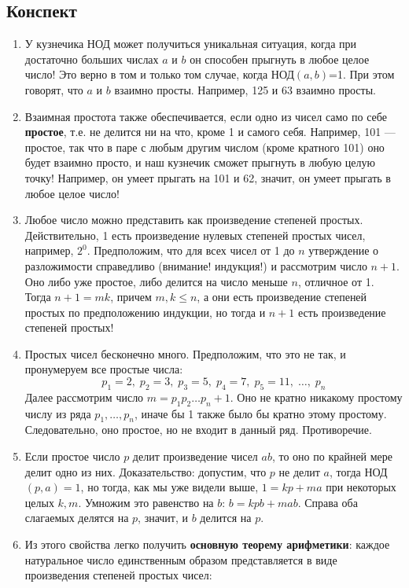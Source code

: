 \subsection{Конспект}
\begin{enumerate}\setlength{\itemsep}{1pt}
\item У кузнечика НОД может получиться уникальная ситуация, когда при достаточно больших числах $a$ и $b$ он способен прыгнуть в любое целое число! Это верно в том и только том случае, когда НОД$(a,b)$=1. При этом говорят, что $a$ и $b$ взаимно просты. Например, 125 и 63 взаимно просты.
\item Взаимная простота также обеспечивается, если одно из чисел само по себе \textbf{простое}, т.е. не делится ни на что, кроме 1 и самого себя. Например, 101 --- простое, так что в паре с любым другим числом (кроме кратного 101) оно будет взаимно просто, и наш кузнечик сможет прыгнуть в любую целую точку! Например, он умеет прыгать на 101 и 62, значит, он умеет прыгать в любое целое число!
\item Любое число можно представить как произведение степеней простых. Действительно, 1 есть произведение нулевых степеней простых чисел, например, $2^0$. Предположим, что для всех чисел от 1 до $n$ утверждение о разложимости справедливо (внимание! индукция!) и рассмотрим число $n+1$. Оно либо уже простое, либо делится на число меньше $n$, отличное от 1. Тогда $n+1=mk$, причем $m,k\le n$, а они есть произведение степеней простых по предположению индукции, но тогда и $n+1$ есть произведение степеней простых!
\item Простых чисел бесконечно много. Предположим, что это не так, и пронумеруем все простые числа:
$$
p_1=2,\;p_2=3,\;p_3=5,\;p_4=7,\;p_5=11,\;\dots,\;p_n
$$
Далее рассмотрим число $m=p_1p_2\dots p_n+1$. Оно не кратно никакому простому числу из ряда $p_1,\dots,p_n$, иначе бы 1 также было бы кратно этому простому. Следовательно, оно простое, но не входит в данный ряд. Противоречие.
\item Если простое число $p$ делит произведение чисел $ab$, то оно по крайней мере делит одно из них. Доказательство: допустим, что $p$ не делит $a$, тогда НОД$(p,a)=1$, но тогда, как мы уже видели выше, $1=kp+ma$ при некоторых целых $k,m$. Умножим это равенство на $b$: $b=kpb+mab$. Справа оба слагаемых делятся на $p$, значит, и $b$ делится на $p$.
\item Из этого свойства легко получить \textbf{основную теорему арифметики}: каждое натуральное число единственным образом представляется в виде произведения степеней простых чисел:

\end{enumerate}
